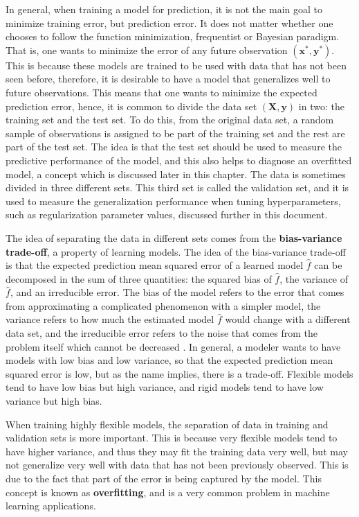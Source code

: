 In general, when training a model for prediction, it is not the main goal to minimize training error, but prediction error. It does not matter whether one chooses to follow the function minimization, frequentist or Bayesian paradigm. That is, one wants to minimize the error of any future observation $(\boldsymbol{x}^*, \boldsymbol{y}^*)$. This is because these models are trained to be used with data that has not been seen before, therefore, it is desirable to have a model that generalizes well to future observations. This means that one wants to minimize the expected prediction error, hence, it is common to divide the data set $(\boldsymbol{X}, \boldsymbol{y})$ in two: the training set and the test set. To do this, from the original data set, a random sample of observations is assigned to be part of the training set and the rest are part of the test set. The idea is that the test set should be used to measure the predictive performance of the model, and this also helps to diagnose an overfitted model, a concept which is discussed later in this chapter. The data is sometimes divided in three different sets. This third set is called the validation set, and it is used to measure the generalization performance when tuning hyperparameters, such as regularization parameter values, discussed further in this document.

The idea of separating the data in different sets comes from the \textbf{bias-variance trade-off}, a property of learning models. The idea of the bias-variance trade-off is that the expected prediction mean squared error of a learned model $\hat{f}$ can be decomposed in the sum of three quantities: the squared bias of $\hat{f}$, the variance of $\hat{f}$, and an irreducible error. The bias of the model refers to the error that comes from approximating a complicated phenomenon with a simpler model, the variance refers to how much the estimated model $\hat{f}$ would change with a different data set, and the irreducible error refers to the noise that comes from the problem itself which cannot be decreased \cite{friedman2001elements} \cite{james2013introduction}. In general, a modeler wants to have models with low bias and low variance, so that the expected prediction mean squared error is low, but as the name implies, there is a trade-off. Flexible models tend to have low bias but high variance, and rigid models tend to have low variance but high bias.

When training highly flexible models, the separation of data in training and validation sets is more important. This is because very flexible models tend to have higher variance, and thus they may fit the training data very well, but may not generalize very well with data that has not been previously observed. This is due to the fact that part of the error is being captured by the model. This concept is known as \textbf{overfitting}, and is a very common problem in machine learning applications.



